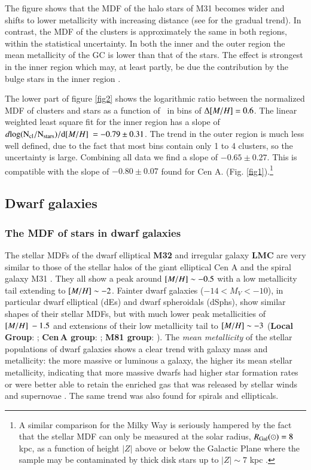 \documentclass{aa}
\begin{document}
The figure shows that the MDF of the halo stars of M31 becomes wider and shifts to lower metallicity with
increasing distance (see \citet{kalirai06} for the gradual trend). In contrast, the MDF of the clusters
is approximately the same in both regions, within the statistical uncertainty. In both
the inner and the outer region the mean metallicity of the GC is lower
than that of the stars. The effect is strongest in the inner region which may, at least partly, be due 
the contribution by the bulge stars in the inner region \citep{kalirai06}. 

The lower part of figure \ref{fig2} shows the logarithmic ratio between the normalized MDF 
of clusters and stars as a function of \feh\ in bins of $\Delta \mbox{$[M/H]$}=0.6$.  
The linear weighted least square fit for the inner region has a slope of 
$d \rm{log}(N_{\rm cl}/N_{\rm stars}) /d \mbox{$[M/H]$} ~= -0.79 \pm 0.31$. 
The trend in the outer region is much less well defined, due to the fact that 
most bins contain only 1 to 4 clusters, so the uncertainty is large.
Combining all data we find a slope of $ -0.65 \pm 0.27$. This is compatible with the slope of $-0.80 \pm 0.07$ 
found for Cen A. (Fig. \ref{fig1}).\footnote{A similar 
comparison for the Milky Way is seriously hampered by the fact that
the stellar MDF can only be  measured at the solar radius,  $\mbox{$R_{\rm Gal}$}(\odot)=8$ kpc, as a function of 
height $|Z|$ above or below the Galactic Plane where the  sample may be 
contaminated by thick disk stars up to $|Z| \sim 7$ kpc \citep{juric08}.}
     

\subsection{Dwarf galaxies}  \label{sec:obs:dwarfs}
 

\subsubsection{The MDF of stars in dwarf galaxies} \label{sec:2.2.1}


The stellar MDFs of the dwarf elliptical {\bf M32} \citep{grillmair96} and
irregular galaxy {\bf LMC} \citep{cole00, haschke12} are very similar to those of the
stellar halos of the giant elliptical Cen A and the spiral galaxy M31
\citep{harrisharris01}. They all show a peak around $\mbox{$[M/H]$} \sim -0.5$
with a low metallicity tail extending to $\mbox{$[M/H]$} \sim -2$.
Fainter dwarf galaxies ($-14<M_V<-10$), in particular dwarf elliptical (dEs) 
and dwarf spheroidals (dSphs),
show similar shapes of their stellar MDFs, but with much lower peak
metallicities of $\mbox{$[M/H]$} ~ -1.5$ and extensions of their low metallicity tail
to $\mbox{$[M/H]$} \sim -3$ ({\bf Local Group}: \citet{starkenburg10}; {\bf Cen\,A group}:
\citet{crnojevic10}; {\bf M81 group}: \citet{lianou10}).
The {\it mean metallicity} of the stellar populations of dwarf galaxies
shows a clear trend with galaxy mass and metallicity: the more massive or
luminous a galaxy, the higher its mean stellar metallicity, indicating that more
massive dwarfs had higher star formation rates or were better able to retain
the enriched gas that was released by stellar winds and supernovae \citep{grebel03}.
The same trend was also found for spirals and ellipticals.
\end{document}
